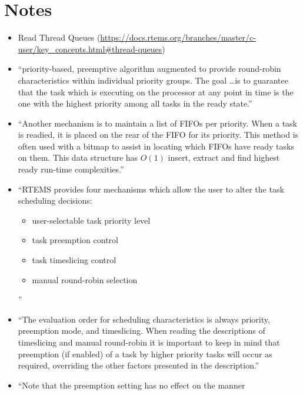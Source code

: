 \section{Notes}

\begin{itemize}
    \item  Read Thread Queues \cite[\S3.5]{RTEMS:CUSER}
      (\url{https://docs.rtems.org/branches/master/c-user/key_concepts.html#thread-queues})
    \item 
      ``priority-based, preemptive algorithm augmented to provide round-robin
        characteristics within individual priority groups. The goal \dots is to
        guarantee that the task which is executing on the processor at any point
        in time is the one with the highest priority among all tasks in the
        ready state.''
        \cite[\S5.2.2]{RTEMS:CUSER}
    \item 
      ``Another mechanism is to maintain a list of FIFOs per priority. 
        When a task is readied, 
        it is placed on the rear of the FIFO for its priority.
        This method is often used with a bitmap to assist in
        locating which FIFOs have ready tasks on them. 
        This data structure has $O(1)$ insert, extract and 
        find highest ready run-time complexities.''
        \cite[\S5.2.2]{RTEMS:CUSER}
    \item 
      ``RTEMS provides four mechanisms which allow the user to alter 
        the task scheduling decisions:
        \begin{itemize}
            \item user-selectable task priority level
            \item task preemption control
            \item task timeslicing control
            \item manual round-robin selection
    \end{itemize}''
      \cite[\S5.2.3]{RTEMS:CUSER}
    \item 
      ``The evaluation order for scheduling characteristics is always priority,
        preemption mode, and timeslicing. 
        When reading the descriptions of timeslicing and manual round-robin
        it is important to keep in mind that preemption (if enabled)
        of a task by higher priority tasks will occur as required, 
        overriding the other factors presented in the description.''
        \cite[\S5.2.3]{RTEMS:CUSER}
    \item 
      ``Note that the preemption setting has no effect on the manner

\end{itemize}
